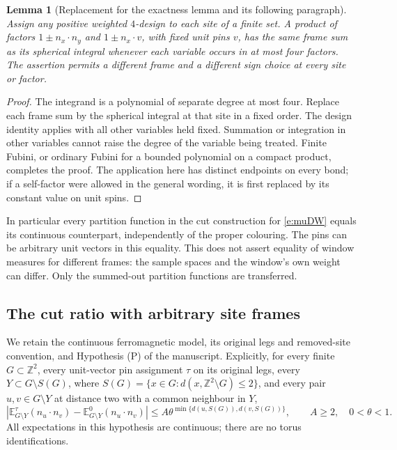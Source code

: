 \documentclass[11pt,reqno]{amsart}
\newtheorem{lemma}[theorem]{Lemma}
\theoremstyle{definition}
\newcommand{\Z}{\mathbb Z}
\newcommand{\E}{\mathbb E}
\begin{document}
\begin{lemma}[Replacement for the exactness lemma and its following paragraph]
\label{l:exact}
Assign any positive weighted $4$-design to each site of a finite set.
A product of factors $1\pm n_x\cdot n_y$ and $1\pm n_x\cdot v$,
with fixed unit pins $v$, has the same frame sum as its spherical
integral whenever each variable occurs in at most four factors.
The assertion permits a different frame and a different sign choice
at every site or factor.
\end{lemma}
\begin{proof}
The integrand is a polynomial of separate degree at most four.
Replace each frame sum by the spherical integral at that site in a
fixed order. The design identity applies with all other variables
held fixed. Summation or integration in other variables cannot raise
the degree of the variable being treated. Finite Fubini, or ordinary
Fubini for a bounded polynomial on a compact product, completes the
proof. The application here has distinct endpoints on every bond;
if a self-factor were allowed in the general wording, it is first
replaced by its constant value on unit spins.
\end{proof}

In particular every partition function in the cut construction for
\eqref{e:muDW} equals its continuous counterpart, independently of
the proper colouring. The pins can be arbitrary unit vectors in
this equality. This does not assert equality of window measures for
different frames: the sample spaces and the window's own weight
can differ. Only the summed-out partition functions are transferred.

\subsection{The cut ratio with arbitrary site frames}

We retain the continuous ferromagnetic model, its original legs and
removed-site convention, and Hypothesis (P) of the manuscript. Explicitly,
for every finite $G\subset\Z^2$, every unit-vector pin assignment $\tau$
on its original legs, every $Y\subset G\setminus S(G)$, where
$S(G)=\{x\in G:d(x,\Z^2\setminus G)\le2\}$, and every pair
$u,v\in G\setminus Y$ at distance two with a common neighbour in $Y$,
\begin{equation}\label{e:P}
 \left|\E^\tau_{G\setminus Y}(n_u\cdot n_v)
             -\E^0_{G\setminus Y}(n_u\cdot n_v)\right|
 \le A\theta^{\min\{d(u,S(G)),d(v,S(G))\}},\qquad
 A\ge2,\quad0<\theta<1.
\end{equation}
All expectations in this hypothesis are continuous; there are no
torus identifications.
\end{document}
